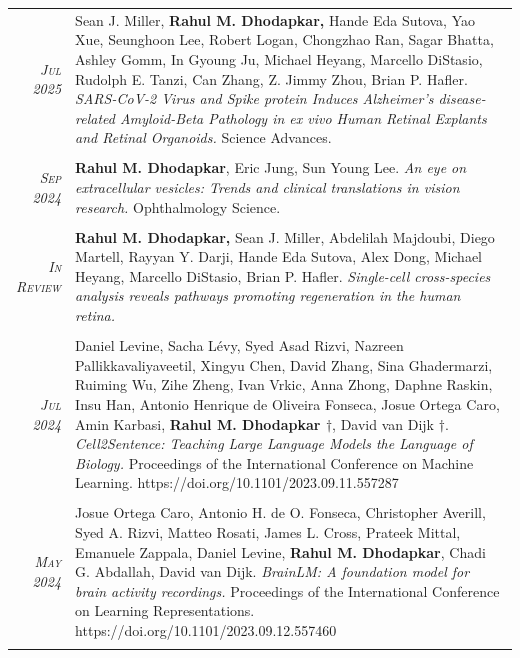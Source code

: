 \documentclass[a4paper,10pt]{article}
\begin{document}
\begin{longtable}{rp{11cm}}
\textit{\textsc{Jul} 2025}& Sean J. Miller, \textbf{Rahul M. Dhodapkar,} Hande Eda Sutova, Yao Xue, Seunghoon Lee, Robert Logan, Chongzhao Ran, Sagar Bhatta, Ashley Gomm, In Gyoung Ju, Michael Heyang, Marcello DiStasio, Rudolph E. Tanzi, Can Zhang, Z. Jimmy Zhou, Brian P. Hafler. {\it SARS-CoV-2 Virus and Spike protein Induces Alzheimer’s disease-related Amyloid-Beta Pathology in ex vivo Human Retinal Explants and Retinal Organoids.} Science Advances.\\
\multicolumn{2}{c}{} \\

\textit{\textsc{Sep} 2024}& \textbf{Rahul M. Dhodapkar}, Eric Jung, Sun Young Lee. {\it An eye on extracellular vesicles: Trends and clinical translations in vision research.} Ophthalmology Science.\\
\multicolumn{2}{c}{} \\

\textit{\textsc{In Review}}& \textbf{Rahul M. Dhodapkar,} Sean J. Miller, Abdelilah Majdoubi, Diego Martell, Rayyan Y. Darji, Hande Eda Sutova, Alex Dong, Michael Heyang, Marcello DiStasio, Brian P. Hafler. {\it Single-cell cross-species analysis reveals pathways promoting regeneration in the human retina.}\\
\multicolumn{2}{c}{} \\

\textit{\textsc{Jul} 2024}& Daniel Levine, Sacha Lévy, Syed Asad Rizvi, Nazreen Pallikkavaliyaveetil, Xingyu Chen, David Zhang, Sina Ghadermarzi, Ruiming Wu, Zihe Zheng, Ivan Vrkic, Anna Zhong, Daphne Raskin, Insu Han, Antonio Henrique de Oliveira Fonseca, Josue Ortega Caro, Amin Karbasi, \textbf{Rahul M. Dhodapkar $\dag$}, David van Dijk $\dag$. {\it Cell2Sentence: Teaching Large Language Models the Language of Biology.} Proceedings of the International Conference on Machine Learning. https://doi.org/10.1101/2023.09.11.557287\\
\multicolumn{2}{c}{} \\

\textit{\textsc{May} 2024}& Josue Ortega Caro, Antonio H. de O. Fonseca, Christopher Averill, Syed A. Rizvi, Matteo Rosati, James L. Cross, Prateek Mittal, Emanuele Zappala, Daniel Levine, \textbf{Rahul M. Dhodapkar}, Chadi G. Abdallah, David van Dijk. {\it BrainLM: A foundation model for brain activity recordings.} Proceedings of the International Conference on Learning Representations. https://doi.org/10.1101/2023.09.12.557460 \\
\multicolumn{2}{c}{} \\


\end{longtable}
\end{document}
